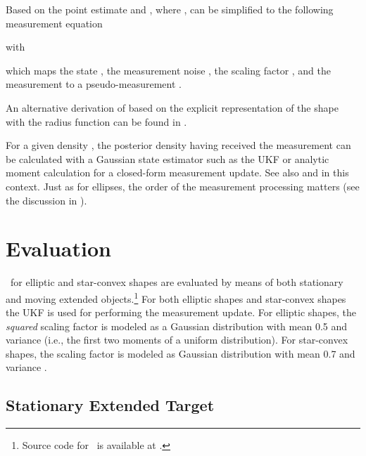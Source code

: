 \documentclass[preprint,1p,11pt]{ISAS_IR}
\newcommand*{\verbBox}{\usebox\myVerb}
\begin{document}
Based on the point estimate and  , where ,  can be simplified to the following measurement equation 

with

which maps the state ,  the measurement noise , the scaling factor , and the measurement  to a pseudo-measurement .

\begin{Remark}
 An alternative derivation of  based on the explicit representation of the shape with the  radius function can be found in \cite{Fusion11_Baum}.
\end{Remark}

For a given  density , the posterior density     having received the measurement   can be calculated with a Gaussian state estimator such as the UKF \cite{Julier_UnscentedFiltering}  or analytic moment calculation \cite{Fusion11_Baum} for a    closed-form measurement update. See also   and  in this context.
Just as for ellipses, the order of the measurement processing matters (see the discussion in ).






\chapter{Evaluation}\label{ssec:eval_ellipse}\label{ssec:eval_starconvex}
\rhms\ for elliptic and star-convex shapes are evaluated by means of both stationary and moving extended objects.\footnote{Source code for \rhms\ is available at  {\verbBox{http://www.cloudrunner.eu}}.}
For both elliptic shapes and star-convex shapes the UKF \cite{Julier_UnscentedFiltering} is used for performing the measurement update.
For elliptic shapes, the \emph{squared} scaling factor is modeled as a Gaussian distribution with mean 0.5 and variance  (i.e., the first two moments of a uniform distribution).
For star-convex shapes, the scaling factor is modeled as Gaussian distribution with mean 0.7 and variance . 


 
\section{Stationary Extended Target}\label{ssec:eval_ellipse_static}

 
\end{document}

